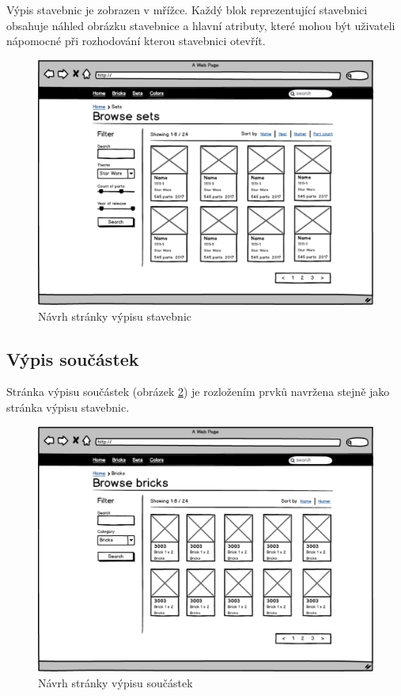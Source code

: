 Výpis stavebnic je zobrazen v mřížce. Každý blok reprezentující stavebnici obsahuje náhled obrázku stavebnice a hlavní atributy, které mohou být uživateli nápomocné při rozhodování kterou stavebnici otevřít.

\begin{figure}[htbp]
    \centering
    \includegraphics[width=\textwidth,height=\textheight,keepaspectratio]{pdfs/wireframe_sets.pdf}
    \caption{Návrh stránky výpisu stavebnic}\label{wireframe-stavebnice-seznam}
\end{figure}

\subsection{Výpis součástek}
Stránka výpisu součástek (obrázek \ref{wireframe-soucaska-seznam}) je rozložením prvků navržena stejně jako stránka výpisu stavebnic. 

\begin{figure}[htbp]
    \centering
    \includegraphics[width=\textwidth,height=\textheight,keepaspectratio]{pdfs/wireframe_bricks.pdf}
    \caption{Návrh stránky výpisu součástek}\label{wireframe-soucaska-seznam}
\end{figure}

